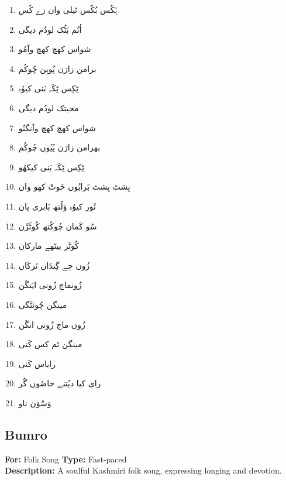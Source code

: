 \documentclass[12pt]{article}
\newcommand{\bigarabic}[1]{\fontsize{16pt}{18pt}\selectfont \textarabic{#1}}
\begin{document}
\begin{multicols}{2}
\begin{RTL}
\begin{enumerate}[leftmargin=*, label=\arabic*., font=\fontsize{16pt}{18pt}\selectfont]
  \item \bigarabic{ہُکُس بُکُس ٹیلی وان زے کُس}
  \item \bigarabic{اُنُم بَٹُک لودُم دیگی}
  \item \bigarabic{شواس کھچ کھچ وآمُو}
  \item \bigarabic{برامن زارَن پُویِن چُوکُم}
  \item \bigarabic{ٹِکِس ٹِکَہ بَنی کیوُہ}
  \item \bigarabic{محبتک لودُم دیگی}
  \item \bigarabic{شواس کھچ کھچ وآنگنُو}
  \item \bigarabic{بھرامن زارَن پُیُوں چُوکُم}
  \item \bigarabic{ٹِکِس ٹِکَہ بَنی کیکھُو}
  \item \bigarabic{بِشٹ بِشٹ بَرایُوں خَوتْ کھو وان}
  \item \bigarabic{تُور کیوُہ وَلُتھ بَابری پان}
  \item \bigarabic{سُو کَمان چُوکُتھ کُوٹَڑَن}
  \item \bigarabic{کُوٹَر بیٹھے مارکان}
  \item \bigarabic{زُون چے گِندَاں تَرکَاں}
  \item \bigarabic{زُونماج زُونی ایَنگَن}
  \item \bigarabic{مینگن چُوئٹَگی}
  \item \bigarabic{زُون ماج زُونی انگَن}
  \item \bigarabic{مینگن تَم کس کَنی}
  \item \bigarabic{رایاس کَنی}
  \item \bigarabic{رای کیا دیُتنے خاصُوں گُر}
  \item \bigarabic{وَسْوَن ناو}
\end{enumerate}
\end{RTL}
\end{multicols}

\subsection*{Bumro}
\textbf{For:} Folk Song \quad \textbf{Type:} Fast-paced\\
\textbf{Description:} A soulful Kashmiri folk song, expressing longing and devotion.
\end{document}
